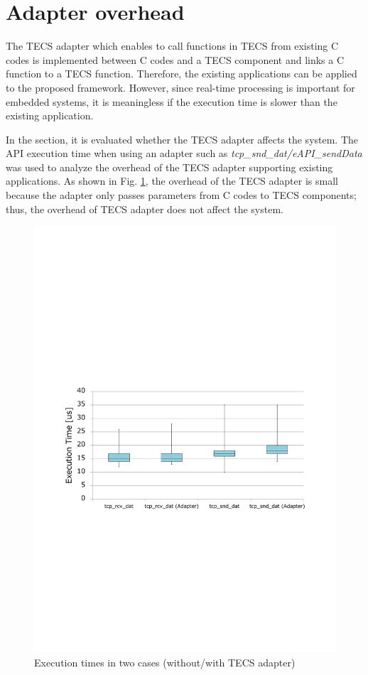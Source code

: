 \documentclass[a4j,12pt,oneside,openany,english]{jsbook}
\begin{document}
\section{Adapter overhead}

The TECS adapter which enables to call functions in TECS from existing C codes is implemented between C codes and a TECS component and links a C function to a TECS function.
Therefore, the existing applications can be applied to the proposed framework.
However, since real-time processing is important for embedded systems, it is meaningless if the execution time is slower than the existing application.

In the section, it is evaluated whether the TECS adapter affects the system.
The API execution time when using an adapter such as {\it tcp\_snd\_dat/eAPI\_sendData} was used to analyze the overhead of the TECS adapter supporting existing applications.
As shown in Fig. \ref{fig:EvaluationOfAdapter}, the overhead of the TECS adapter is small because the adapter only passes parameters from C codes to TECS components; thus, the overhead of TECS adapter does not affect the system.

\begin{figure}[t]
    \centering
    \includegraphics[width=12cm,clip]{figure/EvaluationOfAdapter.pdf}
    \caption{Execution times in two cases (without/with TECS adapter)}
    \label{fig:EvaluationOfAdapter}
\end{figure}
\end{document}
